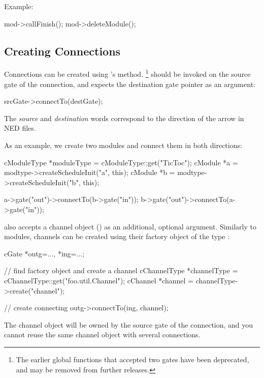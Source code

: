 Example:

\begin{cpp}
mod->callFinish();
mod->deleteModule();
\end{cpp}


\subsection{Creating Connections}

Connections can be created using 's 
method.
  \footnote{The earlier  global functions that
  accepted two gates have been deprecated, and may be removed
  from further {\opp} releases.}
 should be invoked on the source gate
of the connection, and expects the destination gate pointer as
an argument:

\begin{cpp}
srcGate->connectTo(destGate);
\end{cpp}

The \textit{source} and \textit{destination} words correspond
to the direction of the arrow in NED files.

As an example, we create two modules and connect them in both directions:

\begin{cpp}
cModuleType *moduleType = cModuleType::get("TicToc");
cModule *a = modtype->createScheduleInit("a", this);
cModule *b = modtype->createScheduleInit("b", this);

a->gate("out")->connectTo(b->gate("in"));
b->gate("out")->connectTo(a->gate("in"));
\end{cpp}

 also accepts a channel object () as an
additional, optional argument. Similarly to modules, channels can be
created using their factory object of the type :

\begin{cpp}
cGate *outg=..., *ing=...;

// find factory object and create a channel
cChannelType *channelType = cChannelType::get("foo.util.Channel");
cChannel *channel = channelType->create("channel");

// create connecting
outg->connectTo(ing, channel);
\end{cpp}

The channel object will be owned by the source gate of the connection, and
you cannot reuse the same channel object with several connections.

